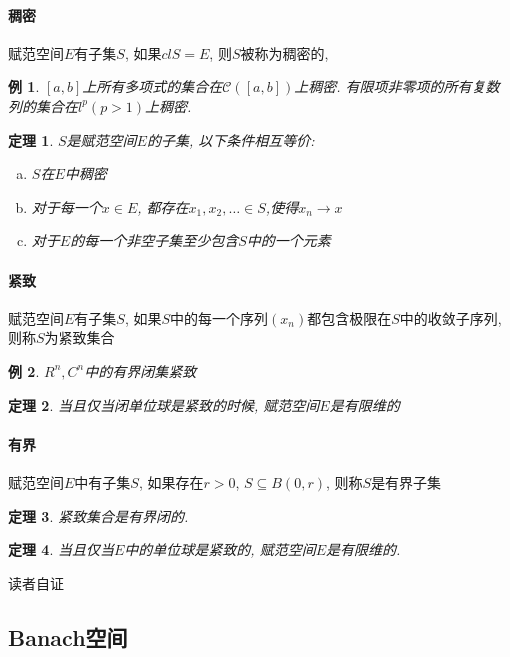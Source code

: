 \documentclass[a4paper,11pt]{article}
\theoremstyle{mystyle}
\newtheorem{theorem}{\hspace{2em}定理}[section]
\newtheorem{example}{\hspace{2em}例}[section]
\begin{document}
\paragraph*{稠密}
\begin{definition}
  赋范空间$E$有子集$S$, 如果$cl S=E$, 则$S$被称为稠密的,
\end{definition}
\begin{example}
  $[a,b]$上所有多项式的集合在$\mathcal{C}([a,b])$上稠密. 有限项非零项的所有复数列的集合在$l^p(p>1)$上稠密.
\end{example}
\begin{theorem}
  $S$是赋范空间$E$的子集, 以下条件相互等价:
  \begin{enumerate}[(a)]
    \item $S$在$E$中稠密
    \item 对于每一个$x\in E$, 都存在$x_1,x_2,\dots\in S$,使得$x_n\to x$
    \item 对于$E$的每一个非空子集至少包含$S$中的一个元素
  \end{enumerate}
\end{theorem}
\paragraph*{紧致}
\begin{definition}
  赋范空间$E$有子集$S$, 如果$S$中的每一个序列$(x_n)$都包含极限在$S$中的收敛子序列, 则称$S$为紧致集合
\end{definition}
\begin{example}
  $R^n,C^n$中的有界闭集紧致
\end{example}
\begin{theorem}
  当且仅当闭单位球是紧致的时候, 赋范空间$E$是有限维的
\end{theorem}
\paragraph*{有界}
\begin{definition}
  赋范空间$E$中有子集$S$, 如果存在$r>0$, $S\subseteq B(0,r)$, 则称$S$是有界子集
\end{definition}
\begin{theorem}
  紧致集合是有界闭的.
\end{theorem}
\begin{theorem}
  当且仅当$E$中的单位球是紧致的, 赋范空间$E$是有限维的.
\end{theorem}
读者自证
\subsection{Banach空间}
\end{document}
